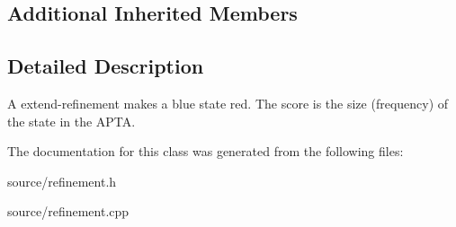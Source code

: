 \subsection*{Additional Inherited Members}


\subsection{Detailed Description}
A extend-\/refinement makes a blue state red. The score is the size (frequency) of the state in the A\+P\+TA. 

The documentation for this class was generated from the following files\+:\begin{DoxyCompactItemize}
\item 
source/refinement.\+h\item 
source/refinement.\+cpp\end{DoxyCompactItemize}
